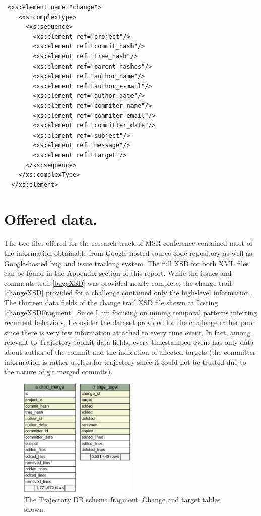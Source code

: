 \documentclass[a4paper,10pt]{article}
\numberwithin{equation}{subsection}
\begin{document}
\lstset{label=changeXSDFragment,caption=List of metadata provided by change trail XML (fragment) }
\begin{lstlisting}
 <xs:element name="change">
    <xs:complexType>
      <xs:sequence>
        <xs:element ref="project"/>
        <xs:element ref="commit_hash"/>
        <xs:element ref="tree_hash"/>
        <xs:element ref="parent_hashes"/>
        <xs:element ref="author_name"/>
        <xs:element ref="author_e-mail"/>
        <xs:element ref="author_date"/>
        <xs:element ref="commiter_name"/>
        <xs:element ref="commiter_email"/>
        <xs:element ref="committer_date"/>
        <xs:element ref="subject"/>
        <xs:element ref="message"/>
        <xs:element ref="target"/>
      </xs:sequence>
    </xs:complexType>
  </xs:element>
\end{lstlisting}

\section{Offered data.}
The two files offered for the research track of MSR conference contained most of the information
obtainable from Google-hosted source code repository as well as Google-hosted bug and issue
tracking system. The full XSD for both XML files can be found in the Appendix section of this report.
While the issues and comments trail \ref{bugsXSD} was provided nearly complete,
the change trail \ref{changeXSD} provided for a challenge contained only the high-level information.
The thirteen data fields of the change trail XSD file shown at Listing \ref{changeXSDFragment}. 
Since I am focusing on mining temporal patterns inferring recurrent behaviors, I consider the dataset 
provided for the challenge rather poor since there is very few information attached to every 
time event. In fact, among relevant to Trajectory toolkit data fields, every timestamped event has 
only data about author of the commit and the indication of affected targets (the committer information
is rather useless for trajectory since it could not be trusted due to the nature of git merged commits).   

\begin{figure}
   \begin{center}
   \includegraphics[scale=0.4,width=0.5\textwidth]{schema-change-fragment}
   \end{center}
   \caption{The Trajectory DB schema fragment. Change and target tables shown.}
   \label{fig:android_downloads}
\end{figure}
\end{document}
